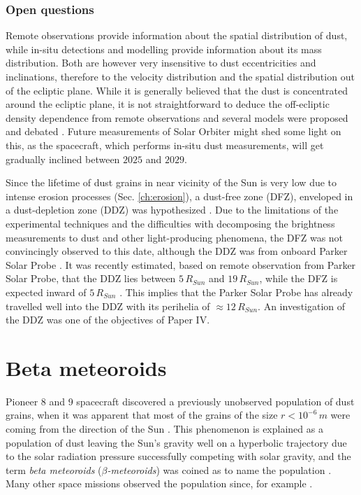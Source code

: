 \subsubsection{Open questions}

Remote observations provide information about the spatial distribution of dust, while in-situ detections and modelling provide information about its mass distribution. Both are however very insensitive to dust eccentricities and inclinations, therefore to the velocity distribution and the spatial distribution out of the ecliptic plane. While it is generally believed that the dust is concentrated around the ecliptic plane, it is not straightforward to deduce the off-ecliptic density dependence from remote observations and several models were proposed and debated \citep{giese1986three}. Future measurements of Solar Orbiter might shed some light on this, as the spacecraft, which performs in-situ dust measurements, will get gradually inclined between $2025$ and $2029$.

Since the lifetime of dust grains in near vicinity of the Sun is very low due to intense erosion processes (Sec. \ref{ch:erosion}), a dust-free zone (DFZ), enveloped in a dust-depletion zone (DDZ) was hypothesized \citep{russell1929meteoric}. Due to the limitations of the experimental techniques and the difficulties with decomposing the brightness measurements to dust and other light-producing phenomena, the DFZ was not convincingly observed to this date, although the DDZ was from onboard Parker Solar Probe \cite{stenborg2018characterization}. It was recently estimated, based on remote observation from Parker Solar Probe, that the DDZ lies between $5 \, R_{Sun}$ and $19 \, R_{Sun}$, while the DFZ is expected inward of $5 \, R_{Sun}$ \citep{stenborg2022psp}. This implies that the Parker Solar Probe has already travelled well into the DDZ with its perihelia of $\approx 12 \, R_{Sun}$. An investigation of the DDZ was one of the objectives of Paper IV.

\section{Beta meteoroids}

Pioneer 8 and 9 spacecraft discovered a previously unobserved population of dust grains, when it was apparent that most of the grains of the size $r < 10^{-6} \, \si{m}$ were coming from the direction of the Sun \citep{berg1973evidence}. This phenomenon is explained as a population of dust leaving the Sun's gravity well on a hyperbolic trajectory due to the solar radiation pressure successfully competing with solar gravity, and the term \textit{beta meteoroids} ($\beta$\textit{-meteoroids}) was coined as to name the population \citep{zook1975source}. Many other space missions observed the population since, for example \cite{zaslavsky2012interplanetary,malaspina2014interplanetary,zaslavsky2021first}.

